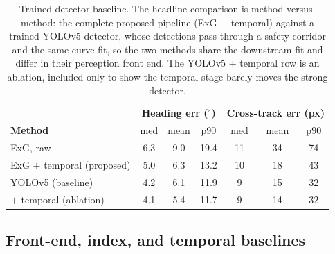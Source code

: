 {\renewcommand{\arraystretch}{1.2}
\begin{table}[!ht]
  \centering
  \caption{Trained-detector baseline. The headline comparison is method-versus-method: the complete proposed
    pipeline (ExG $+$ temporal) against a trained YOLOv5 detector, whose detections pass through a safety
    corridor and the same curve fit, so the two methods share the downstream fit and differ in their
    perception front end. The YOLOv5 $+$ temporal row is an ablation, included only to show the temporal stage
    barely moves the strong detector.}
  \label{tab:res-detector}
  \begin{tabular}{lccc@{\hskip 1.2em}ccc}
    \hline
    & \multicolumn{3}{c}{\textbf{Heading err ($^\circ$)}} & \multicolumn{3}{c}{\textbf{Cross-track err (px)}} \\
    \textbf{Method} & med & mean & p90 & med & mean & p90 \\
    \hline
    ExG, raw                       & 6.3 & 9.0 & 19.4 & 11 & 34 & 74  \\
    ExG $+$ temporal (proposed)    & 5.0 & 6.3 & 13.2 & 10 & 18 & 43  \\
    YOLOv5 (baseline)              & 4.2 & 6.1 & 11.9 & 9  & 15 & 32  \\
    \quad $+$ temporal (ablation)  & 4.1 & 5.4 & 11.7 & 9  & 14 & 32  \\
    \hline
  \end{tabular}
\end{table}}

\subsection{Front-end, index, and temporal baselines}
\label{sec:res-frontend}

